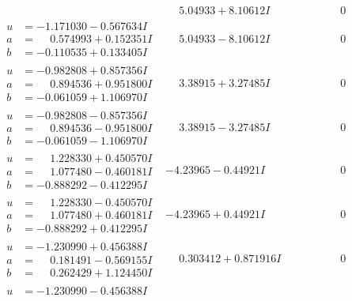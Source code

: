 \documentclass[1p]{elsarticle_modified}
\theoremstyle{definition}
\begin{document}
$$\begin{array}{c|c|c}
 & \phantom{-}5.04933 + 8.10612 I & \phantom{-0.000000 } 0 \\ \hline\begin{aligned}
u &= -1.171030 - 0.567634 I \\
a &= \phantom{-}0.574993 + 0.152351 I \\
b &= -0.110535 + 0.133405 I\end{aligned}
 & \phantom{-}5.04933 - 8.10612 I & \phantom{-0.000000 } 0 \\ \hline\begin{aligned}
u &= -0.982808 + 0.857356 I \\
a &= \phantom{-}0.894536 + 0.951800 I \\
b &= -0.061059 + 1.106970 I\end{aligned}
 & \phantom{-}3.38915 + 3.27485 I & \phantom{-0.000000 } 0 \\ \hline\begin{aligned}
u &= -0.982808 - 0.857356 I \\
a &= \phantom{-}0.894536 - 0.951800 I \\
b &= -0.061059 - 1.106970 I\end{aligned}
 & \phantom{-}3.38915 - 3.27485 I & \phantom{-0.000000 } 0 \\ \hline\begin{aligned}
u &= \phantom{-}1.228330 + 0.450570 I \\
a &= \phantom{-}1.077480 - 0.460181 I \\
b &= -0.888292 - 0.412295 I\end{aligned}
 & -4.23965 - 0.44921 I & \phantom{-0.000000 } 0 \\ \hline\begin{aligned}
u &= \phantom{-}1.228330 - 0.450570 I \\
a &= \phantom{-}1.077480 + 0.460181 I \\
b &= -0.888292 + 0.412295 I\end{aligned}
 & -4.23965 + 0.44921 I & \phantom{-0.000000 } 0 \\ \hline\begin{aligned}
u &= -1.230990 + 0.456388 I \\
a &= \phantom{-}0.181491 - 0.569155 I \\
b &= \phantom{-}0.262429 + 1.124450 I\end{aligned}
 & \phantom{-}0.303412 + 0.871916 I & \phantom{-0.000000 } 0 \\ \hline\begin{aligned}
u &= -1.230990 - 0.456388 I \\

\end{aligned}
\end{array}$$
\end{document}
